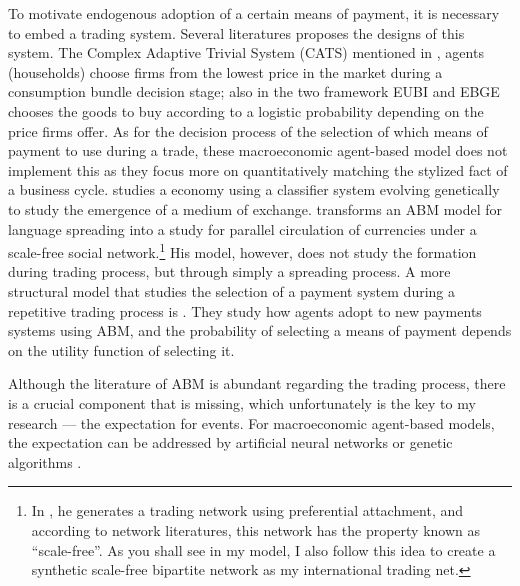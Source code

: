 To motivate endogenous adoption of a certain means of payment, it is necessary
to embed a trading system. Several literatures proposes the designs of this
system. The Complex Adaptive Trivial System (CATS) mentioned in
\citet*{HandbookABM}, agents (households) choose firms from the lowest price in
the market during a consumption bundle decision stage; also in
\citet*{HandbookABM} the two framework EUBI and EBGE chooses the goods to buy
according to a logistic probability depending on the price firms offer. As for
the decision process of the selection of which means of payment to use during a
trade, these macroeconomic agent-based model does not implement this as they
focus more on quantitatively matching the stylized fact of a business cycle.
\citet*{Sargent90-MoneyAI} studies a \citet*{KW98} economy using a classifier
system evolving genetically to study the emergence of a medium of exchange.
\citet*{Manolis21} transforms an ABM model for language spreading into a study
for parallel circulation of currencies under a scale-free social
network.\footnote{In \citet*{Manolis21}, he generates a trading network using
preferential attachment, and according to network literatures, this network has
the property known as ``scale-free''\citep*{Price1976}. As you shall see in my model, I also
follow this idea to create a synthetic scale-free bipartite network as my
international trading net.}
His model, however, does not study the formation during trading process, but through
simply a spreading process.
A more structural model that studies the selection of a payment system during a repetitive trading process is \citet*{Trade_ABM_MOP2006}. They study how agents adopt to new payments systems using ABM, and the probability of selecting a means of payment depends on the utility function of selecting it.

Although the literature of ABM is abundant regarding the trading process, there is a crucial component that is missing, which unfortunately is the key to my research --- the expectation for events. For macroeconomic agent-based models, the expectation can be addressed by artificial neural networks \cite[see][]{Salle15-ABM_EXP} or genetic algorithms \cite[see][]{Arifovic18-GA_EXP}.